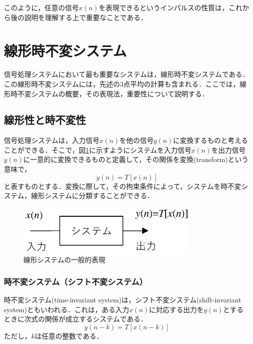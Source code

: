 このように，任意の信号$x(n)$を表現できるというインパルスの性質は，これから後の説明を理解する上で重要なことである．


\section{線形時不変システム}

信号処理システムにおいて最も重要なシステムは，線形時不変システムである．この線形時不変システムには，先述の3点平均の計算も含まれる．ここでは，線形時不変システムの概要，その表現法，重要性について説明する．

\subsection{線形性と時不変性}

信号処理システムは，入力信号$x(n)$を他の信号$y(n)$に変換するものと考えることができる．そこで，図\ref{fig:zu4-2-5}に示すようにシステムを入力信号$x(n)$を出力信号$y(n)$に一意的に変換できるものと定義して，その関係を変換(transform)という意味で，
\begin{equation}
y(n)=T[x(n)]
\end{equation}
と表すものとする．変換に際して，その拘束条件によって，システムを時不変システム，線形システムに分類することができる．

\begin{figure}[H]
\begin{center}
\includegraphics[width=9cm]{fig/zu-2-5.eps}
\end{center}
\caption{線形システムの一般的表現}
\label{fig:zu4-2-5}
\end{figure}

\subsubsection{時不変システム（シフト不変システム）}

時不変システム(time-invariant system)は，シフト不変システム(shift-invariant system)ともいわれる．これは，ある入力$x(n)$に対応する出力を$y(n)$とするときに次式の関係が成立するシステムである．
\begin{equation}
y(n-k)=T[x(n-k)]
\label{eqn:eqn-k2-10}
\end{equation}
ただし，$k$は任意の整数である．


